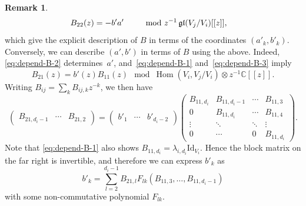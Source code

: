 \documentclass[pdftex]{sigma}
\numberwithin{equation}{section}
\theoremstyle{definition}
\newtheorem{Remark}[Theorem]{Remark}
\newcommand{\C}{\mathbb{C}} %
\newcommand{\gl}{\operatorname{\mathfrak{gl}}}
\newcommand{\Hom}{\operatorname{Hom}}
\newcommand{\unit}{\mathrm{Id}}
\begin{document}
\begin{Remark}
\begin{alignat}{2}
B_{22}(z) &= -b'a'
&\quad &\mod z^{-1}\gl(V_j/V_i)[[z]],\notag
\end{alignat}
which give the explicit description of $B$ in terms of the coordinates
$(a'_k,b'_k)$.
Conversely, we can describe $(a',b')$ in terms of $B$ using the above.
Indeed, \eqref{eq:depend-B-2} determines~$a'$,
and~\eqref{eq:depend-B-1} and~\eqref{eq:depend-B-3} imply
\[
B_{21}(z) = b'(z) B_{11}(z) \mod \Hom(V_i,V_j/V_i) \otimes z^{-1}\C[[z]].
\]
Writing $B_{ij}=\sum_k B_{ij,k} z^{-k}$, we then have
\[
\begin{pmatrix}
B_{21,d_i-1} & \cdots & B_{21,2}
\end{pmatrix}=
\begin{pmatrix}
b'_1 & \cdots & b'_{d_i-2}
\end{pmatrix}
\begin{pmatrix}
B_{11,d_i} & B_{11,d_i-1} & \cdots & B_{11,3} \\
0 & B_{11,d_i} & \cdots & B_{11,4} \\
\vdots & \ddots & \ddots & \vdots \\
0 & \cdots & 0 & B_{11,d_i}
\end{pmatrix}.
\]
Note that \eqref{eq:depend-B-1} also shows
$B_{11,d_i}=\lambda_{i,d_i}\unit_{V_i}$.
Hence the block matrix on the far right is invertible,
and therefore we can express $b'_k$ as
\[
b'_k = \sum_{l=2}^{d_i-1} B_{21,l} F_{lk}(B_{11,3}, \dots ,B_{11,d_i-1})
\]
with some non-commutative polynomial $F_{lk}$.
\end{Remark}
\end{document}
